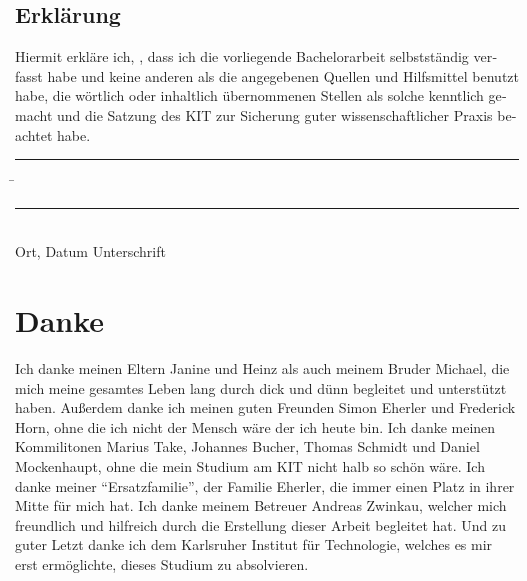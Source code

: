 \documentclass[parskip=full,12pt,a4paper,twoside,headings=openright]{scrreprt}
\begin{document}
\tableofcontents










\begin{otherlanguage}{ngerman}
\chapter*{Erklärung}
\pagestyle{empty}

  \vspace{20mm}
  Hiermit erkläre ich, \theauthor, dass ich die vorliegende Bachelorarbeit selbst\-ständig
verfasst habe und keine anderen als die angegebenen Quellen und Hilfsmittel
benutzt habe, die wörtlich oder inhaltlich übernommenen Stellen als solche kenntlich gemacht und
die Satzung des KIT zur Sicherung guter wissenschaftlicher Praxis beachtet habe.
  \vspace{20mm}
  \begin{tabbing}
  \rule{4cm}{.4pt}\hspace{1cm} \= \rule{7cm}{.4pt} \\
 Ort, Datum \> Unterschrift
  \end{tabbing}
\end{otherlanguage}

\chapter*{Danke}
\pagestyle{empty}

Ich danke meinen Eltern Janine und Heinz als auch meinem Bruder Michael, die mich meine gesamtes Leben lang durch dick und dünn
begleitet und unterstützt haben. Außerdem danke ich meinen guten Freunden Simon Eherler und Frederick Horn, ohne die ich nicht der
Mensch wäre der ich heute bin. Ich danke meinen Kommilitonen Marius Take, Johannes Bucher, Thomas Schmidt und Daniel Mockenhaupt,
ohne die mein Studium am KIT nicht halb so schön wäre. Ich danke meiner "`Ersatzfamilie"', der Familie Eherler,
die immer einen Platz in ihrer Mitte für mich hat. Ich danke meinem Betreuer Andreas Zwinkau, welcher
mich freundlich und hilfreich durch die Erstellung dieser Arbeit begleitet hat. Und zu guter Letzt
danke ich dem Karlsruher Institut für Technologie, welches es mir erst ermöglichte, dieses Studium zu absolvieren.

\pagestyle{fancy}
\appendix

%
\end{document}

